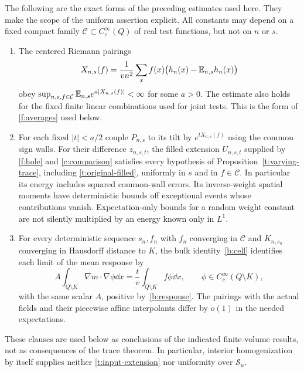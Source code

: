 The following are the exact forms of the preceding estimates used here.
They make the scope of the uniform assertion explicit.  All constants may
depend on a fixed compact family $\mathcal C\subset C_c^\infty(Q)$ of
real test functions, but not on $n$ or $s$.
\begin{enumerate}
\item\label{t:input-moments}
The centered Riemann pairings
\[
 X_{n,s}(f)=\frac1{vn^2}\sum_x f(x)
                 \bigl(h_n(x)-\mathbb E_{n,s}h_n(x)\bigr)
\]
obey $\sup_{n,s,f\in\mathcal C}\mathbb E_{n,s}e^{a|X_{n,s}(f)|}<\infty$
for some $a>0$.  The estimate also holds for the fixed finite linear
combinations used for joint tests.  This is the form of
\ref{f:averages} used below.
\item\label{t:input-extension}
For each fixed $|t|<a/2$ couple $P_{n,s}$ to its tilt by
$e^{tX_{n,s}(f)}$ using the common sign walls.  For their difference
$z_{n,s,t}$, the filled extension $U_{n,s,t}$ supplied by
\ref{f:hole} and \ref{c:comparison} satisfies every hypothesis of
Proposition~\ref{t:varying-trace}, including
\eqref{t:original-filled}, uniformly in $s$ and in $f\in\mathcal C$.
In particular its energy includes squared common-wall errors.  Its
inverse-weight spatial moments have deterministic bounds off exceptional
events whose contributions vanish.  Expectation-only bounds for a random
weight constant are not silently multiplied by an energy known only in
$L^1$.
\item\label{t:input-flux}
For every deterministic sequence $s_n,f_n$ with $f_n$ converging in
$\mathcal C$ and $K_{n,s_n}$ converging in Hausdorff distance to $K$, the
bulk identity~\ref{b:cell} identifies each limit of the mean response by
\begin{equation}\label{t:weak-response}
 A\int_{Q\setminus K}\nabla m\cdot\nabla\phi\dd x
   =\frac{t}{v}\int_{Q\setminus K}f\phi\dd x,
 \qquad \phi\in C_c^\infty(Q\setminus K),
\end{equation}
with the same scalar $A$, positive by~\ref{b:response}.  The pairings with the actual fields and their
piecewise affine interpolants differ by $o(1)$ in the needed expectations.
\end{enumerate}

These clauses are used below as conclusions of the indicated finite-volume
results, not as consequences of the trace theorem.  In particular,
interior homogenization by itself supplies neither
\ref{t:input-extension} nor uniformity over $\mathcal S_n$.

